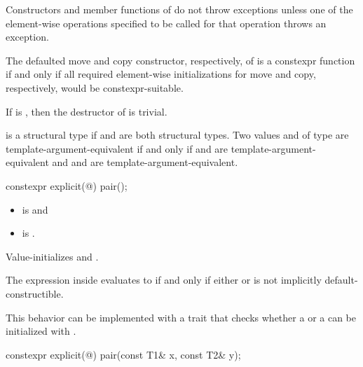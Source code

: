 \pnum
Constructors and member functions of  do not throw exceptions unless one of
the element-wise operations specified to be called for that operation
throws an exception.

\pnum
The defaulted move and copy constructor, respectively, of 
is a constexpr function if and only if all required element-wise
initializations for move and copy, respectively,
would be constexpr-suitable.

\pnum
If 
is , then the destructor of  is trivial.

\pnum
{} is a structural type
if  and  are both structural types.
Two values  and  of type 
are template-argument-equivalent if and only if
 and  are template-argument-equivalent and
 and  are template-argument-equivalent.

%
\begin{itemdecl}
constexpr explicit(@\seebelow@) pair();
\end{itemdecl}

\begin{itemdescr}
\pnum
\constraints
\begin{itemize}
\item {} is  and
\item {} is .
\end{itemize}

\pnum
\effects
Value-initializes  and .

\pnum
\remarks
The expression inside  evaluates to 
if and only if either  or
 is not implicitly default-constructible.
\begin{note}
This behavior can be implemented with a trait that checks
whether a  or a 
can be initialized with \tcode{\{\}}.
\end{note}
\end{itemdescr}

%
\begin{itemdecl}
constexpr explicit(@\seebelow@) pair(const T1& x, const T2& y);
\end{itemdecl}

